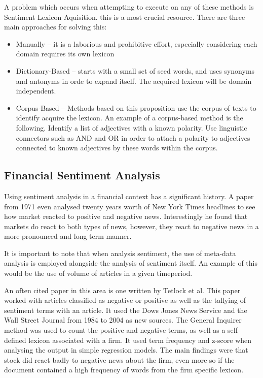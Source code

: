 A problem which occurs when attempting to execute on any of these methods is Sentiment Lexicon Aquisition. this is a most crucial resource. There are three main approaches for solving this:
\begin{itemize}
    \item Manually -- it is a laborious and prohibitive effort, especially considering each domain requires its own lexicon
    \item Dictionary-Based -- starts with a small set of seed words, and uses synonyms and antonyms in orde to expand itself. The acquired lexicon will be domain independent\cite{sentimentDictoinaryConstruction,kamps-etal-2004-using,Peng_Park_2011}.
    \item Corpus-Based -- Methods based on this proposition use the corpus of texts to identify acquire the lexicon. An example of a corpus-based method is the following. Identify a list of adjectives with a known polarity. Use linguistic connectors such as AND and OR in order to attach a polarity to adjectives connected to known adjectives by these words within the corpus\cite{hatzivassiloglou-mckeown-1997-predicting,opinionWordExpansion}.
\end{itemize}

\subsection{Financial Sentiment Analysis}

Using sentiment analysis in a financial context has a significant history. A paper from 1971\cite{RePEc:ucp:jnlbus:v:44:y:1971:i:2:p:193-219} even analysed twenty years worth of New York Times headlines to see how market reacted to positive and negative news. Interestingly he found that markets do react to both types of news, however, they react to negative news in a more pronounced and long term manner.

It is important to note that when analysis sentiment, the use of meta-data analysis is employed alongside the analysis of sentiment itself. An example of this would be the use of volume of articles in a given timeperiod.

An often cited paper in this area is one written by Tetlock et al\cite{RePEc:bla:jfinan:v:63:y:2008:i:3:p:1437-1467}. This paper worked with articles classified as negative or positive as well as the tallying of sentiment terms with an article. It used the Dows Jones News Service and the Wall Street Journal from 1984 to 2004 as new sources. The General Inquirer method was used to count the positive and negative terms, as well as a self-defined lexicon associated with a firm. It used term frequency and z-score when analysing the output in simple regression models. The main findings were that stock did react badly to negative news about the firm, even more so if the document contained a high frequency of words from the firm specific lexicon.

